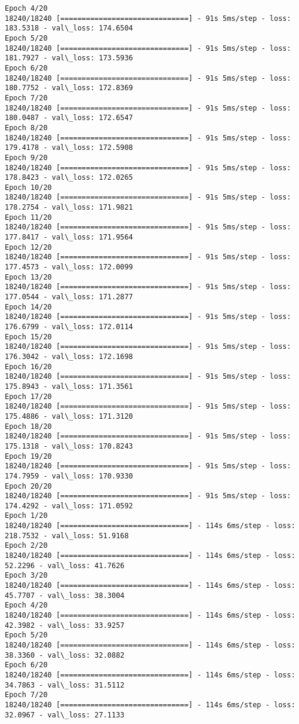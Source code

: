 \documentclass[11pt]{article}
\begin{document}
\begin{Verbatim}[commandchars=\\\{\}]
Epoch 4/20
18240/18240 [==============================] - 91s 5ms/step - loss: 183.5318 - val\_loss: 174.6504
Epoch 5/20
18240/18240 [==============================] - 91s 5ms/step - loss: 181.7927 - val\_loss: 173.5936
Epoch 6/20
18240/18240 [==============================] - 91s 5ms/step - loss: 180.7752 - val\_loss: 172.8369
Epoch 7/20
18240/18240 [==============================] - 91s 5ms/step - loss: 180.0487 - val\_loss: 172.6547
Epoch 8/20
18240/18240 [==============================] - 91s 5ms/step - loss: 179.4178 - val\_loss: 172.5908
Epoch 9/20
18240/18240 [==============================] - 91s 5ms/step - loss: 178.8423 - val\_loss: 172.0265
Epoch 10/20
18240/18240 [==============================] - 91s 5ms/step - loss: 178.2754 - val\_loss: 171.9821
Epoch 11/20
18240/18240 [==============================] - 91s 5ms/step - loss: 177.8417 - val\_loss: 171.9564
Epoch 12/20
18240/18240 [==============================] - 91s 5ms/step - loss: 177.4573 - val\_loss: 172.0099
Epoch 13/20
18240/18240 [==============================] - 91s 5ms/step - loss: 177.0544 - val\_loss: 171.2877
Epoch 14/20
18240/18240 [==============================] - 91s 5ms/step - loss: 176.6799 - val\_loss: 172.0114
Epoch 15/20
18240/18240 [==============================] - 91s 5ms/step - loss: 176.3042 - val\_loss: 172.1698
Epoch 16/20
18240/18240 [==============================] - 91s 5ms/step - loss: 175.8943 - val\_loss: 171.3561
Epoch 17/20
18240/18240 [==============================] - 91s 5ms/step - loss: 175.4886 - val\_loss: 171.3120
Epoch 18/20
18240/18240 [==============================] - 91s 5ms/step - loss: 175.1318 - val\_loss: 170.8243
Epoch 19/20
18240/18240 [==============================] - 91s 5ms/step - loss: 174.7959 - val\_loss: 170.9330
Epoch 20/20
18240/18240 [==============================] - 91s 5ms/step - loss: 174.4292 - val\_loss: 171.0592
Epoch 1/20
18240/18240 [==============================] - 114s 6ms/step - loss: 218.7532 - val\_loss: 51.9168
Epoch 2/20
18240/18240 [==============================] - 114s 6ms/step - loss: 52.2296 - val\_loss: 41.7626
Epoch 3/20
18240/18240 [==============================] - 114s 6ms/step - loss: 45.7707 - val\_loss: 38.3004
Epoch 4/20
18240/18240 [==============================] - 114s 6ms/step - loss: 42.3982 - val\_loss: 33.9257
Epoch 5/20
18240/18240 [==============================] - 114s 6ms/step - loss: 38.3360 - val\_loss: 32.0882
Epoch 6/20
18240/18240 [==============================] - 114s 6ms/step - loss: 34.7863 - val\_loss: 31.5112
Epoch 7/20
18240/18240 [==============================] - 114s 6ms/step - loss: 32.0967 - val\_loss: 27.1133

\end{Verbatim}
\end{document}
